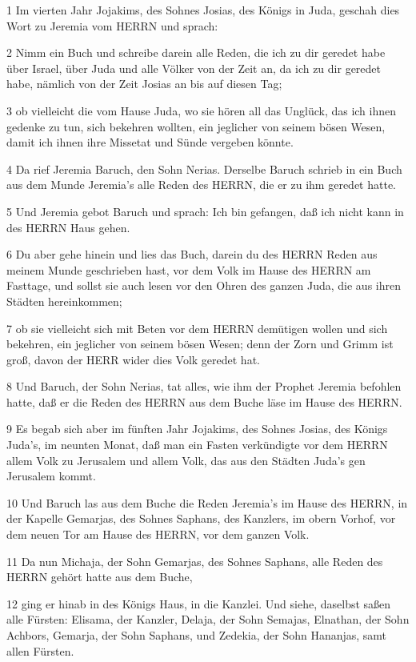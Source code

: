 \par 1 Im vierten Jahr Jojakims, des Sohnes Josias, des Königs in Juda, geschah dies Wort zu Jeremia vom HERRN und sprach:
\par 2 Nimm ein Buch und schreibe darein alle Reden, die ich zu dir geredet habe über Israel, über Juda und alle Völker von der Zeit an, da ich zu dir geredet habe, nämlich von der Zeit Josias an bis auf diesen Tag;
\par 3 ob vielleicht die vom Hause Juda, wo sie hören all das Unglück, das ich ihnen gedenke zu tun, sich bekehren wollten, ein jeglicher von seinem bösen Wesen, damit ich ihnen ihre Missetat und Sünde vergeben könnte.
\par 4 Da rief Jeremia Baruch, den Sohn Nerias. Derselbe Baruch schrieb in ein Buch aus dem Munde Jeremia's alle Reden des HERRN, die er zu ihm geredet hatte.
\par 5 Und Jeremia gebot Baruch und sprach: Ich bin gefangen, daß ich nicht kann in des HERRN Haus gehen.
\par 6 Du aber gehe hinein und lies das Buch, darein du des HERRN Reden aus meinem Munde geschrieben hast, vor dem Volk im Hause des HERRN am Fasttage, und sollst sie auch lesen vor den Ohren des ganzen Juda, die aus ihren Städten hereinkommen;
\par 7 ob sie vielleicht sich mit Beten vor dem HERRN demütigen wollen und sich bekehren, ein jeglicher von seinem bösen Wesen; denn der Zorn und Grimm ist groß, davon der HERR wider dies Volk geredet hat.
\par 8 Und Baruch, der Sohn Nerias, tat alles, wie ihm der Prophet Jeremia befohlen hatte, daß er die Reden des HERRN aus dem Buche läse im Hause des HERRN.
\par 9 Es begab sich aber im fünften Jahr Jojakims, des Sohnes Josias, des Königs Juda's, im neunten Monat, daß man ein Fasten verkündigte vor dem HERRN allem Volk zu Jerusalem und allem Volk, das aus den Städten Juda's gen Jerusalem kommt.
\par 10 Und Baruch las aus dem Buche die Reden Jeremia's im Hause des HERRN, in der Kapelle Gemarjas, des Sohnes Saphans, des Kanzlers, im obern Vorhof, vor dem neuen Tor am Hause des HERRN, vor dem ganzen Volk.
\par 11 Da nun Michaja, der Sohn Gemarjas, des Sohnes Saphans, alle Reden des HERRN gehört hatte aus dem Buche,
\par 12 ging er hinab in des Königs Haus, in die Kanzlei. Und siehe, daselbst saßen alle Fürsten: Elisama, der Kanzler, Delaja, der Sohn Semajas, Elnathan, der Sohn Achbors, Gemarja, der Sohn Saphans, und Zedekia, der Sohn Hananjas, samt allen Fürsten.
